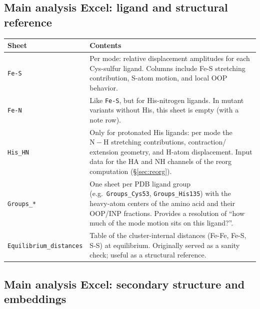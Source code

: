 \documentclass[11pt,a4paper,twoside]{article}
\theoremstyle{remark}
\begin{document}
\subsection{Main analysis Excel: ligand and structural reference}

\begin{longtable}{p{} p{}}
\toprule
\textbf{Sheet} & \textbf{Contents} \\
\midrule
\endhead

\texttt{Fe-S} & Per mode: relative displacement amplitudes for
  each Cys-sulfur ligand. Columns include Fe-S stretching
  contribution, S-atom motion, and local OOP behavior. \\

\texttt{Fe-N} & Like \texttt{Fe-S}, but for His-nitrogen ligands.
  In mutant variants without His, this sheet is empty (with a
  note row). \\

\texttt{His\_HN} & Only for protonated His ligands: per mode the
  $\mathrm{N}-\mathrm{H}$ stretching contributions, contraction/
  extension geometry, and H-atom displacement. Input data for the
  HA and NH channels of the reorg computation
  (\S\ref{sec:reorg}). \\

\texttt{Groups\_*} & One sheet per PDB ligand group (e.g.\
  \texttt{Groups\_Cys53}, \texttt{Groups\_His135}) with the
  heavy-atom centers of the amino acid and their OOP/INP
  fractions. Provides a resolution of ``how much of the mode
  motion sits on this ligand?''. \\

\texttt{Equilibrium\_distances} & Table of the cluster-internal
  distances (Fe-Fe, Fe-S, S-S) at equilibrium. Originally
  served as a sanity check; useful as a structural reference. \\
\bottomrule
\end{longtable}

\subsection{Main analysis Excel: secondary structure and embeddings}
\end{document}
